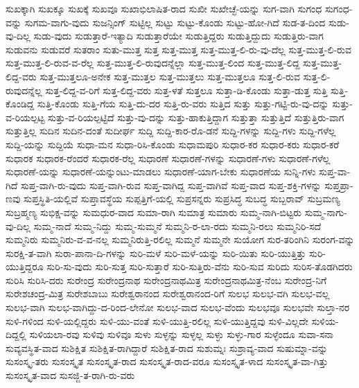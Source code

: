 {ಸುಖಕ್ಕಾಗಿ
ಸುಖಕ್ಕೂ
ಸುಖಕ್ಕೆ
ಸುಖವೂ
ಸುಖಾಭಿಲಾಷಿತ-ರಾದ
ಸುಖೀ
ಸುಖೇಚ್ಛೆ-ಯನ್ನು
ಸುಗ-ವಾಗಿ
ಸುಗಂಧ
ಸುಗಂಧ-ವನ್ನು
ಸುಗಮ-ವಾಗು-ವುದು
ಸುಜನ್ಸಿಂಗ್
ಸುಟ್ಟಿಲ್ಲ
ಸುಟ್ಟು
ಸುಟ್ಟು-ಕೊಂಡು
ಸುಟ್ಟು-ಹೋ-ಗಿದೆ
ಸುಡ-ತ-ದಿಂದ
ಸುಡು-ವು-ದಿಲ್ಲ
ಸುಡು-ವುದು
ಸುಡುತ್ತಾರೆ-ಇತ್ಯಾದಿ
ಸುಡುತ್ತಾರೆಯೇ
ಸುಡುತ್ತಿದ್ದರು
ಸುಡುತ್ತಿದ್ದುದು
ಸುಡುತ್ತಿರು-ವಾಗ
ಸುಡುವನು
ಸುಡುವರೆ
ಸುತರಾಂ
ಸುತು-ಮುತ್ತ
ಸುತ್ತ
ಸುತ್ತ-ಮುತ್ತ
ಸುತ್ತ-ಮುತ್ತ-ಲಿ-ರು-ವು-ದೆಲ್ಲ
ಸುತ್ತ-ಮುತ್ತ-ಲಿ-ರುವ
ಸುತ್ತ-ಮುತ್ತ-ಲಿ-ರುವ-ವ-ರೆಲ್ಲ
ಸುತ್ತ-ಮುತ್ತ-ಲಿ-ರುವುದನ್ನೆಲ್ಲಾ
ಸುತ್ತ-ಮುತ್ತ-ಲಿಂದ
ಸುತ್ತ-ಮುತ್ತ-ಲಿದ್ದ
ಸುತ್ತ-ಮುತ್ತ-ಲಿದ್ದ-ವರು
ಸುತ್ತ-ಮುತ್ತಲೂ-ಅನೇಕ
ಸುತ್ತ-ಮುತ್ತಲ
ಸುತ್ತ-ಮುತ್ತಲು
ಸುತ್ತ-ಮುತ್ತಲೂ
ಸುತ್ತ-ಲಿ-ರುವ
ಸುತ್ತ-ಲಿ-ರುವುದನ್ನೆಲ್ಲ
ಸುತ್ತ-ಲಿದ್ದ-ವ-ರಿಗೆ
ಸುತ್ತ-ಲಿದ್ದ-ವರು
ಸುತ್ತ-ಳತೆ
ಸುತ್ತಲೂ
ಸುತ್ತಾ-ಡಿ-ಕೊಂಡು
ಸುತ್ತಾ-ಡುತ್ತ
ಸುತ್ತಿ
ಸುತ್ತಿ-ಕೊಂಡಿದ್ದ
ಸುತ್ತಿ-ಕೊಂಡು
ಸುತ್ತಿ-ಗೆಯ
ಸುತ್ತಿ-ದು-ದರ
ಸುತ್ತಿ-ರು-ವರು
ಸುತ್ತಿದ
ಸುತ್ತು
ಸುತ್ತು-ಗಟ್ಟಿ-ರು-ವು-ದನ್ನು
ಸುತ್ತು-ವ-ರಿಯಲ್ಪಟ್ಟ
ಸುತ್ತು-ವ-ರಿಯಲ್ಪಟ್ಟಿದೆ
ಸುತ್ತು-ವು-ದನ್ನು
ಸುತ್ತು-ಹಾಕುತ್ತಿದ್ದಾಗ
ಸುತ್ತುತ್ತಾ
ಸುತ್ತುತ್ತಿದೆ
ಸುತ್ತುತ್ತಿರು-ವಾಗ
ಸುತ್ತುತ್ತಿಲ್ಲ
ಸುದಿನ
ಸುದಿನ-ದಂತೆ
ಸುದೀರ್ಘ
ಸುದ್ದಿ
ಸುದ್ದಿ-ಕಾರ-ರೊ-ಡನೆ
ಸುದ್ದಿ-ಗಳನ್ನು
ಸುದ್ದಿ-ಗಳು
ಸುದ್ದಿ-ಗಳೆಲ್ಲ
ಸುದ್ದಿ-ಯನ್ನು
ಸುದ್ದಿಯೆ
ಸುಧಾ-ಮನ
ಸುಧಾ-ರಿಸಿ-ಕೊಂಡು
ಸುಧಾಮಪುರಿ
ಸುಧಾರ-ಕರ
ಸುಧಾರ-ಕರು
ಸುಧಾರ-ಕರೆ
ಸುಧಾರಕ
ಸುಧಾರಕ-ರೆಂದರೆ
ಸುಧಾರಕ-ರೆಲ್ಲ
ಸುಧಾರಣೆ
ಸುಧಾರಣೆ-ಗಳನ್ನು
ಸುಧಾರಣೆ-ಗಳು
ಸುಧಾರಣೆ-ಗಳೆಲ್ಲ
ಸುಧಾರಣೆ-ಯನ್ನು
ಸುಧಾರಣೆ-ಯನ್ನುಂಟು-ಮಾಡಲು
ಸುಧಾರಣೆ-ಯಾಗ-ಬೇಕು
ಸುಧಾರಣೆಯ
ಸುನ್ನಿ-ಗಳು
ಸುಪ್ತ-ವಾ-ಗಿದೆ
ಸುಪ್ತ-ವಾಗಿ-ರು-ವುದು
ಸುಪ್ತ-ವಾಗಿ-ರುವ
ಸುಪ್ತ-ವಾಗಿದ್ದ
ಸುಪ್ತ-ವಾಗಿವೆ
ಸುಪ್ತ-ವಾದ
ಸುಪ್ತ-ಶಕ್ತಿ-ಗಳನ್ನು
ಸುಪ್ತಪ್ರಾ-ಣವು
ಸುಪ್ತಸ್ಥಿತಿ-ಯಲ್ಲಿವೆ
ಸುಪ್ತಾವಸ್ಥೆಯ
ಸುಪ್ಪತ್ತಿಗೆ-ಯಲ್ಲಿ
ಸುಪ್ರಸನ್ನರು
ಸುಪ್ರಸಿದ್ಧ
ಸುಬದ್ಧ
ಸುಬ್ಬರಾವ್
ಸುಬ್ರಮಣ್ಯ
ಸುಬ್ರಹ್ಮಣ್ಯ
ಸುಭಿಕ್ಷ-ವನ್ನು
ಸುಮಧುರ-ವಾದ
ಸುಮಾ-ರಾಗಿ
ಸುಮಾತ್ರ
ಸುಮಾರು
ಸುಮ್ಮ-ನಾಗಿ-ಬಿಟ್ಟರು
ಸುಮ್ಮ-ನಾಗು-ವು-ದಿಲ್ಲ
ಸುಮ್ಮ-ನಾದೆ
ಸುಮ್ಮ-ನಿದ್ದು
ಸುಮ್ಮ-ಸುಮ್ಮನೆ
ಸುಮ್ಮನಿ-ರ-ಲಾ-ರದು
ಸುಮ್ಮನಿ-ರಲು
ಸುಮ್ಮನಿರಿ-ಸದೆ
ಸುಮ್ಮನಿರು
ಸುಮ್ಮನಿರು-ವ-ವ-ನಲ್ಲ
ಸುಮ್ಮನಿರುತ್ತಿ-ರಲಿಲ್ಲ
ಸುಮ್ಮನೆ
ಸುಮ್ಮನೇ
ಸುಯೋಗ
ಸುರ-ತರಿಂಗಿನಿ
ಸುರಂಗ-ವನ್ನು
ಸುರಕ್ಷಿ-ತ-ವಾಗಿ
ಸುರಾ-ಪಾನಾ-ದಿ-ಗಳನ್ನು
ಸುರಿ-ಮಳೆ
ಸುರಿ-ಮಳೆ-ಯನ್ನು
ಸುರಿ-ಯಿತು
ಸುರಿ-ಯುತ್ತಿತ್ತು
ಸುರಿ-ಯುತ್ತಿದ್ದರೂ
ಸುರಿ-ಸು-ವುದು
ಸುರಿ-ಸುತ್ತ
ಸುರಿ-ಸುತ್ತಾರೆ
ಸುರಿ-ಸುತ್ತಿರು-ವೆನು
ಸುರಿ-ಸುವ
ಸುರಿದು
ಸುರಿಸ-ತೊಡಗಿದರು
ಸುರಿಸಿ
ಸುರಿಸಿ-ದರು
ಸುರೇಂದ್ರ
ಸುರೇಂದ್ರನಾಥ
ಸುರೇಂದ್ರನಾಥಮಿತ್ರ
ಸುರೇಂದ್ರನಾಥಮಿತ್ರ-ನೆಂಬ
ಸುರೇಂದ್ರ-ನಿಗೆ
ಸುರೇಶಚಂದ್ರ-ಮಿತ್ರ
ಸುರೇಶಬಾಬು
ಸುರೇಶ್ವರಾನಂದ
ಸುರೇಶ್ವರಾನಂದ-ರಿಗೆ
ಸುಲಭ
ಸುಲಭ-ವಗಿ
ಸುಲಭ-ವಲ್ಲ
ಸುಲಭ-ವಾಗಿ
ಸುಲಭ-ವಾಗಿದ್ದು-ದ-ರಿಂದ-ಲೇನೋ
ಸುಲಭ-ವಾದ
ಸುಲಭ-ವೆಂದು
ಸುಲಭವೂ
ಸುಲಭವೇ
ಸುಲ್ತಾ-ನರ
ಸುಳಿ-ಗಳಿಂದ
ಸುಳಿ-ಯಲ್ಲಿದ್ದರು
ಸುಳಿ-ಯು-ವಂತೆ
ಸುಳಿ-ಯುತ್ತಿ-ರಲಿಲ್ಲ
ಸುಳಿ-ಯುತ್ತಿದ್ದವು
ಸುಳಿ-ವಿಲ್ಲದೇ
ಸುಳಿಯ-ದಿದ್ದಲ್ಲಿ
ಸುಳಿಯಲಾ-ರವು
ಸುಳಿವು
ಸುಳಿವೂ
ಸುಳು
ಸುಳ್ಳನ್ನು
ಸುಳ್ಳಲ್ಲ
ಸುಳ್ಳು
ಸುಳ್ಳು-ಗಾರ
ಸುಳ್ಳೆಂದೂ
ಸುವಾ-ಸನಾ
ಸುವ್ಯವಸ್ಥಿತ-ವಾದ
ಸುಶಿಕ್ಷಿತ
ಸುಶಿಕ್ಷಿತ-ರಾಗಿದ್ದಾರೆ
ಸುಶಿಕ್ಷಿತ-ರಾದ
ಸುಶುಮ್ನಃ
ಸುಶ್ರಾವ್ಯ-ವಾದ
ಸುಷುಮ್ನಾ-ವನ್ನು
ಸುಸಂಸ್ಕೃ-ತರು
ಸುಸಂಸ್ಕೃತ
ಸುಸಂಸ್ಕೃತ-ರಾದ
ಸುಸಂಸ್ಕೃತ-ರಾದ-ವರೂ
ಸುಸಂಸ್ಕೃತ-ಳಾದ
ಸುಸಂಸ್ಕೃತ-ವಾ-ಗಿತ್ತು
ಸುಸಂಸ್ಕೃತ-ವಾದ
ಸುಸಜ್ಜಿ-ತ-ರಾಗಿ-ರು-ವರು
}
